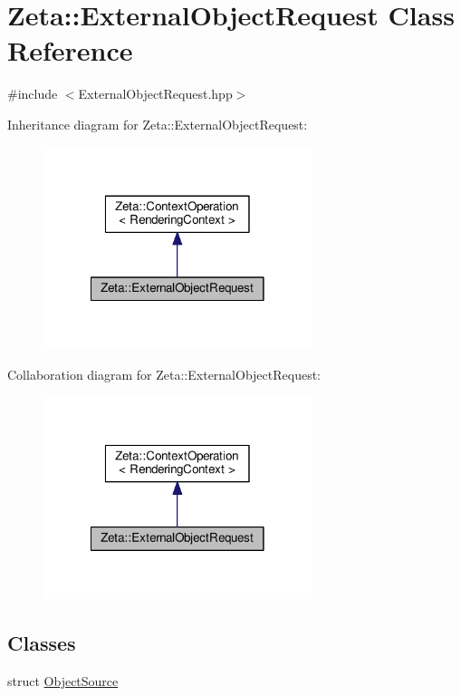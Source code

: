 \hypertarget{classZeta_1_1ExternalObjectRequest}{\section{Zeta\+:\+:External\+Object\+Request Class Reference}
\label{classZeta_1_1ExternalObjectRequest}
}


{\ttfamily \#include $<$External\+Object\+Request.\+hpp$>$}



Inheritance diagram for Zeta\+:\+:External\+Object\+Request\+:\nopagebreak
\begin{figure}[H]
\begin{center}
\leavevmode
\includegraphics[width=222pt]{classZeta_1_1ExternalObjectRequest__inherit__graph}
\end{center}
\end{figure}


Collaboration diagram for Zeta\+:\+:External\+Object\+Request\+:\nopagebreak
\begin{figure}[H]
\begin{center}
\leavevmode
\includegraphics[width=222pt]{classZeta_1_1ExternalObjectRequest__coll__graph}
\end{center}
\end{figure}
\subsection*{Classes}
\begin{DoxyCompactItemize}
\item 
struct \hyperlink{structZeta_1_1ExternalObjectRequest_1_1ObjectSource}{Object\+Source}
\end{DoxyCompactItemize}
